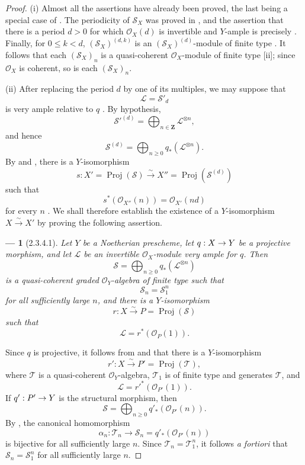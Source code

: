 \documentclass[oneside]{amsart}
\theoremstyle{ega-env-style}
\newtheorem*{env}{---}
\theoremstyle{ega-thm-env-style}
\theoremstyle{ega-defn-env-style}
\def\mathcal{\mathscr}
\def\sh{\mathcal}                   %
\def\bb{\mathbf}                    %
\def\leq{\leqslant}                 %
\def\geq{\geqslant}                 %
\def\Proj{\operatorname{Proj}}
\renewcommand{\to}{\mathchoice{\longrightarrow}{\rightarrow}{\rightarrow}{\rightarrow}}
\def\simto{\xrightarrow{\sim}}
\newcommand{\oldpage}[2][]{{\marginnote{\normalfont{\textbf{#1}~|~#2}}}\ignorespaces}
\let\EGAOriginalLabel\label
\renewcommand{\label}[1]{\phantomsection\EGAOriginalLabel{#1}}
\begin{document}
\begin{proof}
(i) Almost all the assertions have already been proved, the last being a special case of .
The periodicity of $\sh{S}_X$ was proved in , and the assertion that there is a period $d>0$ for which $\sh{O}_X(d)$ is invertible and $Y$-ample is precisely .
Finally, for $0\leq k<d$, $(\sh{S}_X)^{(d,k)}$ is an $(\sh{S}_X)^{(d)}$-module of finite type .
It follows that each $(\sh{S}_X)_n$ is a quasi-coherent $\sh{O}_X$-module of finite type [ii]; since $\sh{O}_X$ is coherent, so is each $(\sh{S}_X)_n$.

(ii) After replacing the period $d$ by one of its multiples, we may suppose that
\[
  \sh{L}=\sh{S}'_d
\]
is very ample relative to $q$ .
By hypothesis,
\[
  \sh{S}'^{(d)}
  =\bigoplus_{n\in\bb{Z}}\sh{L}^{\otimes n},
\]
and hence
\[
  \sh{S}^{(d)}
  =\bigoplus_{n\geq0}q_*(\sh{L}^{\otimes n}).
\]
By  and , there is a $Y$-isomorphism
\[
  s:X'=\Proj(\sh{S})\simto
  X''=\Proj(\sh{S}^{(d)})
\]
such that
\oldpage[III]{105}
\[
  s^*(\sh{O}_{X''}(n))=\sh{O}_{X'}(nd)
\]
for every $n$ .
We shall therefore establish the existence of a $Y$-isomorphism $X\simto X'$ by proving the following assertion.

\begin{env}[2.3.4.1]
\label{III.2.3.4.1}
Let $Y$ be a Noetherian prescheme, let $q:X\to Y$ be a projective morphism, and let $\sh{L}$ be an invertible $\sh{O}_X$-module very ample for $q$.
Then
\[
  \sh{S}=\bigoplus_{n\geq0}q_*(\sh{L}^{\otimes n})
\]
is a quasi-coherent graded $\sh{O}_Y$-algebra of finite type such that
\[
  \sh{S}_n=\sh{S}_1^n
\]
for all sufficiently large $n$, and there is a $Y$-isomorphism
\[
  r:X\simto P=\Proj(\sh{S})
\]
such that
\[
  \sh{L}=r^*(\sh{O}_P(1)).
\]
\end{env}

Since $q$ is projective, it follows from  and  that there is a $Y$-isomorphism
\[
  r':X\simto P'=\Proj(\sh{T}),
\]
where $\sh{T}$ is a quasi-coherent $\sh{O}_Y$-algebra, $\sh{T}_1$ is of finite type and generates $\sh{T}$, and
\[
  \sh{L}=r'^*(\sh{O}_{P'}(1)).
\]
If $q':P'\to Y$ is the structural morphism, then
\[
  \sh{S}=\bigoplus_{n\geq0}q'_*(\sh{O}_{P'}(n)).
\]
By , the canonical homomorphism
\[
  \alpha_n:\sh{T}_n\longrightarrow
  \sh{S}_n=q'_*(\sh{O}_{P'}(n))
\]
is bijective for all sufficiently large $n$.
Since $\sh{T}_n=\sh{T}_1^n$, it follows \emph{a fortiori} that $\sh{S}_n=\sh{S}_1^n$ for all sufficiently large $n$.


\end{proof}
\end{document}
